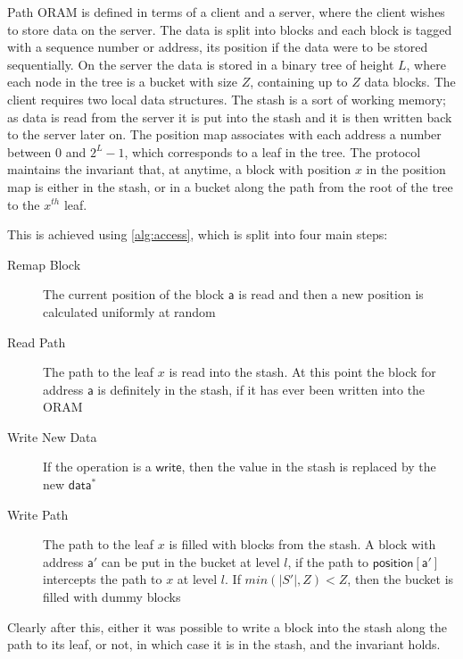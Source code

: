 \documentclass[12pt,a4paper,twoside,openright]{report}
\begin{document}
Path ORAM is defined in terms of a client and a server, where the client wishes to store data on the server. The data is split into blocks and each block is tagged with a sequence number or address, its position if the data were to be stored sequentially. On the server the data is stored in a binary tree of height $L$, where each node in the tree is a bucket with size $Z$, containing up to $Z$ data blocks. The client requires two local data structures. The stash is a sort of working memory; as data is read from the server it is put into the stash and it is then written back to the server later on. The position map associates with each address a number between $0$ and $2^L-1$, which corresponds to a leaf in the tree. The protocol maintains the invariant that, at anytime, a block with position $x$ in the position map is either in the stash, or in a bucket along the path from the root of the tree to the $x^{th}$ leaf.

This is achieved using \cref{alg:access}, which is split into four main steps:

\begin{description}
	\item[Remap Block] The current position of the block $\mathsf{a}$ is read and then a new position is calculated uniformly at random
	\item[Read Path] The path to the leaf $x$ is read into the stash. At this point the block for address $\mathsf{a}$ is definitely in the stash, if it has ever been written into the ORAM
	\item[Write New Data] If the operation is a $\mathsf{write}$, then the value in the stash is replaced by the new $\mathsf{data^*}$
	\item[Write Path] The path to the leaf $x$ is filled with blocks from the stash. A block with address $\mathsf{a'}$ can be put in the bucket at level $l$, if the path to $\mathsf{position[a']}$ intercepts the path to $x$ at level $l$. If $min(|S'|,Z) < Z$, then the bucket is filled with dummy blocks
\end{description}

Clearly after this, either it was possible to write a block into the stash along the path to its leaf, or not, in which case it is in the stash, and the invariant holds.
\end{document}
